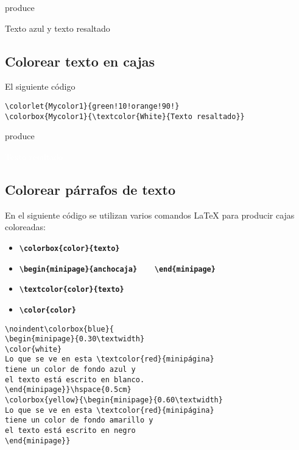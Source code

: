 \documentclass[12pt,a4paper,]{book}
\providecommand{\tightlist}{%
  \setlength{\itemsep}{0pt}\setlength{\parskip}{0pt}}
\numberwithin{dummy}{section}
\theoremstyle{ocrenumbox}
\theoremstyle{blacknumex}
\theoremstyle{blacknumbox}
\theoremstyle{ocrenum}
\theoremstyle{ocrenum}
\begin{document}
produce

\textcolor{blue!90!}{Texto azul} y
\textcolor{green!10!orange!90!}{texto resaltado}

\hypertarget{colorear-texto-en-cajas}{%
\subsection{Colorear texto en cajas}\label{colorear-texto-en-cajas}}

El siguiente código

\begin{verbatim}
\colorlet{Mycolor1}{green!10!orange!90!}
\colorbox{Mycolor1}{\textcolor{White}{Texto resaltado}}
\end{verbatim}

produce


\colorbox{Mycolor1}{\textcolor{White}{Texto resaltado}}

\hypertarget{colorear-puxe1rrafos-de-texto}{%
\subsection{Colorear párrafos de
texto}\label{colorear-puxe1rrafos-de-texto}}

En el siguiente código se utilizan varios comandos LaTeX para producir
cajas coloreadas:

\begin{itemize}
\tightlist
\item
  \textbf{\texttt{\textbackslash{}colorbox\{color\}\{texto\}}}
\item
  \textbf{\texttt{\textbackslash{}begin\{minipage\}\{anchocaja\}\ \ \ \ \textbackslash{}end\{minipage\}}}
\item
  \textbf{\texttt{\textbackslash{}textcolor\{color\}\{texto\}}}
\item
  \textbf{\texttt{\textbackslash{}color\{color\}}}
\end{itemize}

\begin{verbatim}
\noindent\colorbox{blue}{
\begin{minipage}{0.30\textwidth}
\color{white}
Lo que se ve en esta \textcolor{red}{minipágina} 
tiene un color de fondo azul y
el texto está escrito en blanco. 
\end{minipage}}\hspace{0.5cm} 
\colorbox{yellow}{\begin{minipage}{0.60\textwidth} 
Lo que se ve en esta \textcolor{red}{minipágina} 
tiene un color de fondo amarillo y
el texto está escrito en negro
\end{minipage}}
\end{verbatim}
\end{document}
